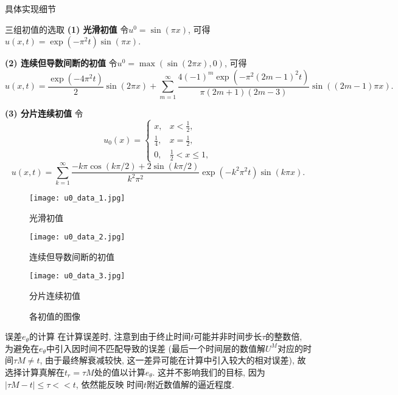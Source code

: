 \documentclass{article}
\begin{document}
\begin{section}{具体实现细节}
    \begin{subsection}{三组初值的选取}
        \noindent\textbf{(1) 光滑初值} 令$u^0=\sin(\pi x)$, 可得$u(x,t)=\exp(-\pi^2 t)\sin(\pi x)$.
        
        \noindent\textbf{(2) 连续但导数间断的初值} 令$u^0=\max(\sin(2\pi x),0)$, 可得
        $$u(x,t) = \frac{\exp(-4\pi^2 t)}{2}\sin(2\pi x) + \sum_{m=1}^\infty \frac{4(-1)^m\exp(-\pi^2(2m-1)^2t)}{\pi(2m+1)(2m-3)} \sin((2m-1)\pi x).$$

        \noindent\textbf{(3) 分片连续初值} 令$$u_0(x) = \left\{\begin{array}{ll}
            x, & x<\frac{1}{2},\\
            \frac{1}{4}, & x=\frac{1}{2},\\
            0, & \frac{1}{2}<x\leq 1,
        \end{array}\right.$$
        $$u(x,t) = \sum_{k=1}^\infty \frac{-k\pi\cos(k\pi/2)+2\sin(k\pi/2)}{k^2\pi^2}\exp(-k^2\pi^2 t)\sin(k\pi x).$$

        \begin{figure}[htbp]
            \begin{minipage}[t]{0.3\linewidth}
            \centering
            \texttt{[image: u0\_data\_1.jpg]}
            \caption{光滑初值}
            \end{minipage}%
            \hfill
            \begin{minipage}[t]{0.33\linewidth}
                \centering
                \texttt{[image: u0\_data\_2.jpg]}
                \caption{连续但导数间断的初值}
            \end{minipage}%
            \hfill
            \begin{minipage}[t]{0.3\linewidth}
            \centering
            \texttt{[image: u0\_data\_3.jpg]}
            \caption{分片连续初值}
            \end{minipage}
            \caption{各初值的图像}
        \end{figure}
    \end{subsection}
    \begin{subsection}{误差$e_\theta$的计算}
        在计算误差时, 注意到由于终止时间$t$可能并非时间步长$\tau$的整数倍, 为避免在$e_\theta$中引入因时间不匹配导致的误差
        (最后一个时间层的数值解$U^{M}$对应的时间$\tau M\neq t$, 由于最终解衰减较快, 这一差异可能在计算中引入较大的相对误差), 
        故选择计算真解在$t_r=\tau M$处的值以计算$e_\theta$. 这并不影响我们的目标, 因为$|\tau M-t|\leq\tau<<t$, 依然能反映
        时间$t$附近数值解的逼近程度.


\end{subsection}
\end{section}
\end{document}
